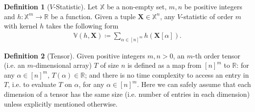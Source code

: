 \documentclass[sn-mathphys, natbib=false]{sn-jnl}
\theoremstyle{plain}
\theoremstyle{definition}
\newtheorem{definition}{Definition}
\newtheorem{remark}{Remark}
\newcommand{\ustat}{\mathbb{U}}
\newcommand{\vstat}{\mathbb{V}}
\newcommand{\ustatp}[2]{\ustat(#1,#2)}
\newcommand{\vstatp}[2]{\vstat(#1,#2)}
\newcommand{\perm}[1]{\mathsf{Perm}(#1)}
\newcommand{\bbR}{{\mathbb{R}}}
\newcommand{\reals}{{\mathbb{R}}}
\def\bbX{\mathbb{X}}
\begin{document}
\begin{bibunit}[agsm]

\begin{definition}[$V$-Statistic]\label{def:v_stat}
Let $\bbX$ be a non-empty set, $m, n$ be positive integers and $h: \bbX^{m} \rightarrow \bbR$ be a function. Given a tuple $\bm{X} \in \bbX^n$, any $V$-statistic of order $m$ with kernel $h$ takes the following form 
    \begin{align*}
        \vstatp{h}{\bm{X}} \coloneqq \sum_{\alpha \in [n]^m} h(\bm{X}[\alpha]). 
    \end{align*} 
\end{definition}

\begin{definition}[Tensor]
\label{def:tensors}
Given positive integers $m, n > 0$, an $m$-th order tensor (i.e. an $m$-dimensional array) $T$ of size $n$ is defined as a map from $[n]^m$ to $\reals$: for any $\alpha \in [n]^{m}$, $T (\alpha) \in \bbR$; and there is no time complexity to access an entry in $T$, i.e. to evaluate $T$ on $\alpha$, for any $\alpha \in [n]^{m}$. Here we can safely assume that each dimension of a tensor has the same size (i.e. number of entries in each dimension) unless explicitly mentioned otherwise.
\end{definition}


\end{bibunit}
\end{document}
